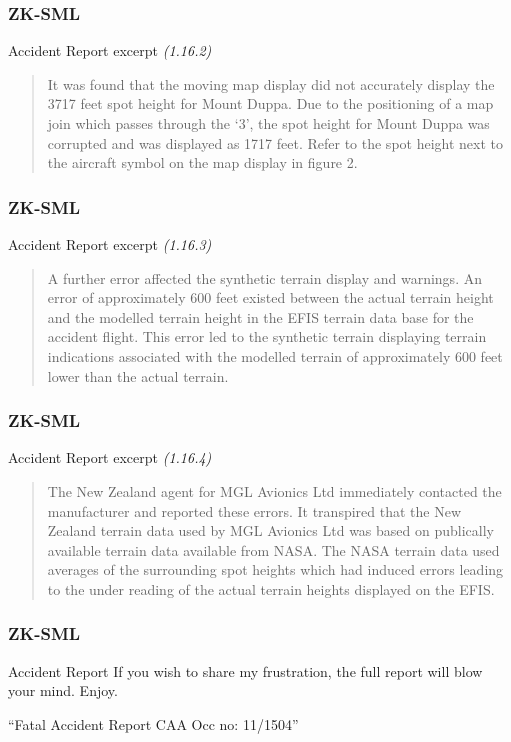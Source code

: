 \begin{frame}
\frametitle{ZK-SML}
\begin{block}{Accident Report excerpt \tiny{\emph{(1.16.2)}}}
\begin{quote}
It was found that the moving map display did not accurately display the 3717 feet spot height for Mount Duppa.  Due to the positioning of a map join which passes through the `3', the spot height for Mount Duppa was corrupted and was displayed as 1717 feet.  Refer to the spot height next to the aircraft symbol on the map display in figure 2. 
\end{quote}
\end{block}
\end{frame}

\begin{frame}
\frametitle{ZK-SML}
\begin{block}{Accident Report excerpt \tiny{\emph{(1.16.3)}}}
\begin{quote}
A further error affected the synthetic terrain display and warnings.  An error of approximately 600 feet existed between the actual terrain height and the modelled terrain height in the EFIS terrain data base for the accident flight.  This error led to the synthetic terrain displaying terrain indications associated with the modelled terrain of approximately 600 feet lower than the actual terrain. 
\end{quote}
\end{block}
\end{frame}

\begin{frame}
\frametitle{ZK-SML}
\begin{block}{Accident Report excerpt \tiny{\emph{(1.16.4)}}}
\begin{quote}
The New Zealand agent for MGL Avionics Ltd immediately contacted the manufacturer and reported these errors.  It transpired that the New Zealand terrain data used by MGL Avionics Ltd was based on publically available terrain data available from NASA.  The NASA terrain data used averages of the surrounding spot heights which had induced errors leading to the under reading of the actual terrain heights displayed on the EFIS. 
\end{quote}
\end{block}
\end{frame}

\begin{frame}
\frametitle{ZK-SML}
\begin{block}{Accident Report}
If you wish to share my frustration, the full report will blow your mind. Enjoy.
\end{block}
``Fatal Accident Report CAA Occ no: 11/1504''
\end{frame}

